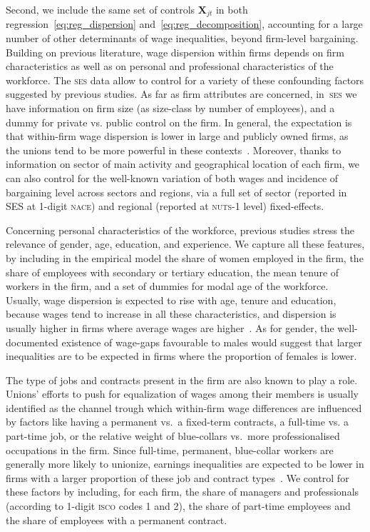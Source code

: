 \documentclass[12pt]{article}
\begin{document}
Second, we include the same set of controls $\bm{X}_{jt}$ in both
regression~\ref{eq:reg_dispersion} and~\ref{eq:reg_decomposition},
accounting for a large number of other determinants of wage inequalities,
beyond firm-level bargaining. Building on previous literature, wage
dispersion within firms depends on firm characteristics as well as on
personal and professional characteristics of the workforce. The
\textsc{ses} data allow to control for a variety of these confounding
factors suggested by previous studies. As far as firm attributes are
concerned, in~\textsc{ses} we have information on firm size (as
size-class by number of employees), and a dummy for private vs. public
control on the firm. In general, the expectation is that within-firm
wage dispersion is lower in large and publicly owned firms, as the
unions tend to be more powerful in these
contexts~\citep{canaldominguez.gutierrez.2004}. Moreover, thanks to
information on sector of main activity and geographical location of
each firm, we can also control for the well-known variation of both
wages and incidence of bargaining level across sectors and regions,
via a full set of sector (reported in SES at 1-digit \textsc{nace})
and regional (reported at \textsc{nuts}-1 level) fixed-effects.

Concerning personal characteristics of the workforce, previous studies
stress the relevance of gender, age, education, and experience. We
capture all these features, by including in the empirical model the
share of women employed in the firm, the share of employees with
secondary or tertiary education, the mean tenure of workers in the
firm, and a set of dummies for modal age of the workforce. Usually,
wage dispersion is expected to rise with age, tenure and education,
because wages tend to increase in all these characteristics, and
dispersion is usually higher in firms where average wages are
higher~\citep{canaldominguez.gutierrez.2004}. As for gender, the
well-documented existence of wage-gaps favourable to males would
suggest that larger inequalities are to be expected in firms where the
proportion of females is lower.

The type of jobs and contracts present in the firm are also known to
play a role. Unions' efforts to push for equalization of wages among
their members is usually identified as the channel trough which
within-firm wage differences are influenced by factors like having a
permanent vs.~a fixed-term contracts, a full-time vs. a part-time job,
or the relative weight of blue-collars vs.~more professionalised
occupations in the firm. Since full-time, permanent, blue-collar
workers are generally more likely to unionize, earnings inequalities
are expected to be lower in firms with a larger proportion of these
job and contract types~\citep{canaldominguez.gutierrez.2004}. We
control for these factors by including, for each firm, the share of
managers and professionals (according to 1-digit \textsc{isco} codes 1
and 2), the share of part-time employees and the share of employees
with a permanent contract.
\end{document}
